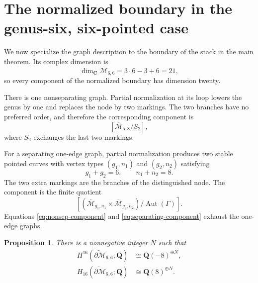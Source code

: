\documentclass[12pt,reqno]{amsart}
\newcommand{\Q}{\mathbf{Q}}
\newcommand{\C}{\mathbf{C}}
\newcommand{\M}{\mathcal{M}}
\newcommand{\Mbar}{\overline{\mathcal{M}}}
\newcommand{\Aut}{\operatorname{Aut}}
\newtheorem{proposition}[theorem]{Proposition}
\theoremstyle{definition}
\theoremstyle{remark}
\begin{document}
\section{The normalized boundary in the genus-six, six-pointed case}

We now specialize the graph description to the boundary of the stack in the
main theorem.  Its complex dimension is
\begin{equation}\label{eq:dimension-66}
 \dim_{\C}\Mbar_{6,6}=3\cdot6-3+6=21,
\end{equation}
so every component of the normalized boundary has dimension twenty.

There is one nonseparating graph.  Partial normalization at its loop lowers
the genus by one and replaces the node by two markings.  The two branches
have no preferred order, and therefore the corresponding component is
\begin{equation}\label{eq:nonsep-component}
 \left[\Mbar_{5,8}/S_2\right],
\end{equation}
where $S_2$ exchanges the last two markings.

For a separating one-edge graph, partial normalization produces two stable
pointed curves with vertex types $(g_1,n_1)$ and $(g_2,n_2)$ satisfying
\begin{equation}\label{eq:separating-numerics}
 g_1+g_2=6,
 \qquad n_1+n_2=8.
\end{equation}
The two extra markings are the branches of the distinguished node.  The
component is the finite quotient
\begin{equation}\label{eq:separating-component}
 \left[
   (\Mbar_{g_1,n_1}\times\Mbar_{g_2,n_2})/
   \Aut(\Gamma)
 \right].
\end{equation}
Equations \eqref{eq:nonsep-component} and
\eqref{eq:separating-component} exhaust the one-edge graphs.

\begin{proposition}\label{prop:boundary-66-tate}
There is a nonnegative integer $N$ such that
\begin{align}
 H^{16}(\widetilde{\partial\M}_{6,6};\Q)
   &\cong\Q(-8)^{\oplus N},\label{eq:boundary-66-cohom}\\
 H_{16}(\widetilde{\partial\M}_{6,6};\Q)
   &\cong\Q(8)^{\oplus N}.
   \label{eq:boundary-66-hom}
\end{align}
\end{proposition}
\end{document}
